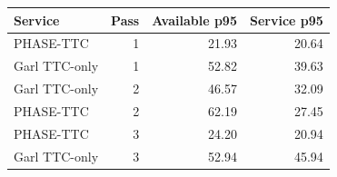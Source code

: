 \begin{tabular}{lrrr}
\toprule
Service & Pass & Available p95 & Service p95 \\
\midrule
PHASE-TTC & 1 & 21.93 & 20.64 \\
Garl TTC-only & 1 & 52.82 & 39.63 \\
Garl TTC-only & 2 & 46.57 & 32.09 \\
PHASE-TTC & 2 & 62.19 & 27.45 \\
PHASE-TTC & 3 & 24.20 & 20.94 \\
Garl TTC-only & 3 & 52.94 & 45.94 \\
\bottomrule
\end{tabular}
